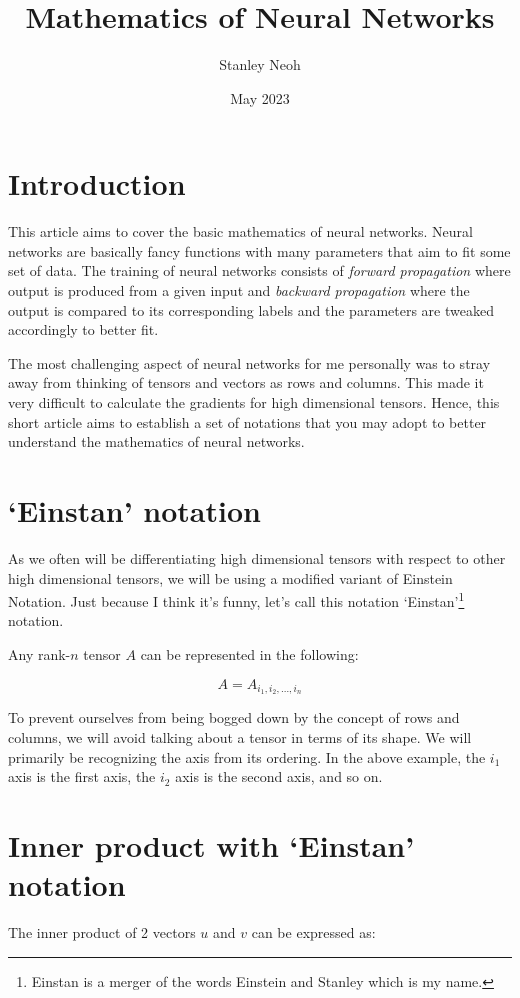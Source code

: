 \documentclass{article}
\title{Mathematics of Neural Networks}
\author{Stanley Neoh}
\date{May 2023}
\begin{document}
\maketitle

\section{Introduction}
This article aims to cover the basic mathematics of neural networks. Neural networks are basically fancy functions with many parameters that aim to fit some set of data. The training of neural networks consists of \emph{forward propagation} where output is produced from a given input and \emph{backward propagation} where the output is compared to its corresponding labels and the parameters are tweaked accordingly to better fit.

The most challenging aspect of neural networks for me personally was to stray away from thinking of tensors and vectors as rows and columns. This made it very difficult to calculate the gradients for high dimensional tensors. Hence, this short article aims to establish a set of notations that you may adopt to better understand the mathematics of neural networks.

\section{`Einstan' notation}
As we often will be differentiating high dimensional tensors with respect to other high dimensional tensors, we will be using a modified variant of Einstein Notation. Just because I think it's funny, let's call this notation `Einstan'\footnote{Einstan is a merger of the words Einstein and Stanley which is my name.} notation.

Any rank-\(n\) tensor \(A\) can be represented in the following:

\[A = A_{i_1, i_2, \dots, i_n}\]

To prevent ourselves from being bogged down by the concept of rows and columns, we will avoid talking about a tensor in terms of its shape. We will primarily be recognizing the axis from its ordering. In the above example, the $i_1$ axis is the first axis, the $i_2$ axis is the second axis, and so on.

\section{Inner product with `Einstan' notation}
The inner product of 2 vectors \(u\) and \(v\) can be expressed as:
\end{document}
